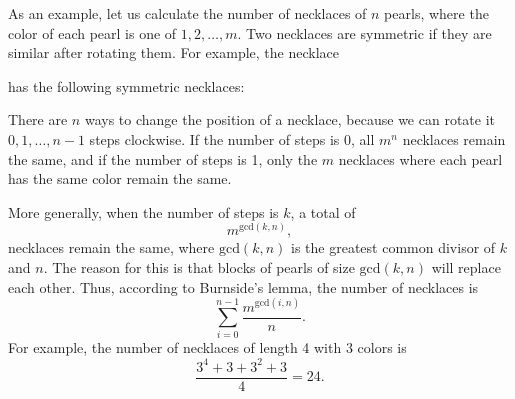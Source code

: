 As an example, let us calculate the number of
necklaces of $n$ pearls,
where the color of each pearl is
one of $1,2,\ldots,m$.
Two necklaces are symmetric if they are
similar after rotating them.
For example, the necklace
\begin{center}
\end{center}
has the following symmetric necklaces:
\begin{center}
\end{center}
There are $n$ ways to change the position
of a necklace,
because we can rotate it
$0,1,\ldots,n-1$ steps clockwise.
If the number of steps is 0,
all $m^n$ necklaces remain the same,
and if the number of steps is 1,
only the $m$ necklaces where each
pearl has the same color remain the same.

More generally, when the number of steps is $k$,
a total of
\[m^{\textrm{gcd}(k,n)},\]
necklaces remain the same,
where $\textrm{gcd}(k,n)$ is the greatest common
divisor of $k$ and $n$.
The reason for this is that blocks
of pearls of size $\textrm{gcd}(k,n)$
will replace each other.
Thus, according to Burnside's lemma,
the number of necklaces is
\[\sum_{i=0}^{n-1} \frac{m^{\textrm{gcd}(i,n)}}{n}. \]
For example, the number of necklaces of length 4
with 3 colors is
\[\frac{3^4+3+3^2+3}{4} = 24. \]

